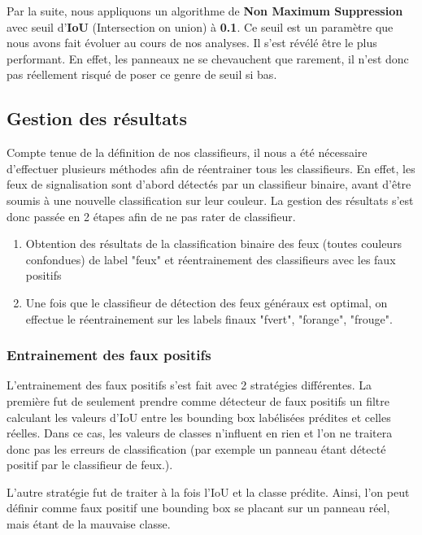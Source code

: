 \documentclass[a4paper,11pt]{article}
\begin{document}
\vspace{2mm}

\noindent Par la suite, nous appliquons un algorithme de \textbf{Non Maximum Suppression} avec seuil d'\textbf{IoU} (Intersection on union) à \textbf{0.1}. Ce seuil est un paramètre que nous avons fait évoluer au cours de nos analyses. Il s'est révélé être le plus performant. En effet, les panneaux ne se chevauchent que rarement, il n'est donc pas réellement risqué de poser ce genre de seuil si bas.

\subsection{Gestion des résultats}

Compte tenue de la définition de nos classifieurs, il nous a été nécessaire d'effectuer plusieurs méthodes afin de réentrainer tous les classifieurs. En effet, les feux de signalisation sont d'abord détectés par un classifieur binaire, avant d'être soumis à une nouvelle classification sur leur couleur. La gestion des résultats s'est donc passée en 2 étapes afin de ne pas rater de classifieur.

\begin{enumerate}[label=\arabic*.]
    \item Obtention des résultats de la classification binaire des feux (toutes couleurs confondues) de label "feux" et réentrainement des classifieurs avec les faux positifs
    \item Une fois que le classifieur de détection des feux généraux est optimal, on effectue le réentrainement sur les labels finaux "fvert", "forange", "frouge".
\end{enumerate}

\subsubsection{Entrainement des faux positifs}

L'entrainement des faux positifs s'est fait avec 2 stratégies différentes. La première fut de seulement prendre comme détecteur de faux positifs un filtre calculant les valeurs d'IoU entre les bounding box labélisées prédites et celles réelles. Dans ce cas, les valeurs de classes n'influent en rien et l'on ne traitera donc pas les erreurs de classification (par exemple un panneau étant détecté positif par le classifieur de feux.). 

\noindent L'autre stratégie fut de traiter à la fois l'IoU et la classe prédite. Ainsi, l'on peut définir comme faux positif une bounding box se placant sur un panneau réel, mais étant de la mauvaise classe. 
\end{document}
